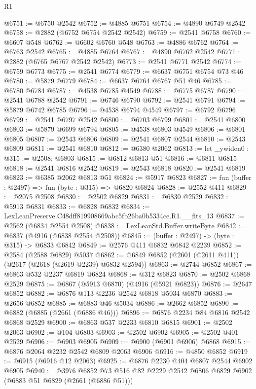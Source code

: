 \begin{lexlean}{R1}
\begin{coremodule}
@6751 := @6750 @2542
@6752 := @4885 @6751
@6754 := @4890 @6749 @2542
@6758 := @2882 (@6752 @6754 @2542 @2542)
@6759 := @2541 @6758
@6760 := @6607 @548
@6762 := @6602 @6760 @548
@6763 := @4886 @6762
@6764 := @6763 @2542
@6765 := @4885 @6764
@6767 := @4890 @6762 @2542
@6771 := @2882 (@6765 @6767 @2542 @2542)
@6773 := @2541 @6771 @2542
@6774 := @6759 @6773
@6775 := @2541 @6774
@6779 := @6637 @6751 @6754 @73 @46
@6780 := @5879 @6779
@6784 := @6637 @6764 @6767 @51 @46
@6785 := @6780 @6784
@6787 := @4538 @6785 @4549
@6788 := @6775 @6787
@6790 := @2541 @6788 @2542
@6791 := @6746 @6790
@6792 := @2541 @6791
@6794 := @5879 @6742 @6785
@6796 := @4538 @6794 @4549
@6797 := @6792 @6796
@6799 := @2541 @6797 @2542
@6800 := @6703 @6799
@6801 := @2541 @6800
@6803 := @5879 @6699 @6794
@6805 := @4538 @6803 @4549
@6806 := @6801 @6805
@6807 := @2543 @6806
@6809 := @2541 @6807 @2544
@6810 := @2543 @6809
@6811 := @2541 @6810
@6812 := @6380 @2062
@6813 := let _ywiden0 : @315 := @2508; @6803
@6815 := @6812 @6813 @51
@6816 := @6811 @6815
@6818 := @2541 @6816 @2542
@6819 := @2543 @6818
@6820 := @2541 @6819
@6823 := @6385 @2062 @6813 @51
@6824 := @5917 @6823
@6827 := fun (buffer : @2497) => fun (byte : @315) => @6820 @6824
@6828 := @2552 @411
@6829 := @2075 @2508
@6830 := @2502 @6829
@6831 := @6830 @2529
@6832 := @5913 @6831
@6833 := @6828 @6832
@6834 := LexLeanPreserve.C48dff819908669abc5fb26ba0b5334ce.R1.__fits_13
@6837 := @2562 (@6834 @2554 @2508)
@6838 := LexLeanStd.Buffer.writeByte
@6842 := @6837 (@4916 (@6838 @2554 @2508))
@6845 := (buffer : @2497) -> (byte : @315) -> @6833 @6842
@6849 := @2576 @411 @6832 @6842 @2239
@6852 := @2584 (@2588 @6829) @5037
@6862 := @6849 @6852 (@2601 (@2611 @411)) (@2617 (@2618 (@2619 @2239) @6832 @2594))
@6863 := @2744 @6852
@6867 := @6863 @532 @2237 @6819 @6824
@6868 := @312 @6823
@6870 := @2502 @6868 @2529
@6875 := @6867 (@5913 @6870) (@4916 (@5921 @6823))
@6876 := @2647 @6852
@6882 := @6876 @113 @2236 @2542 @6818 @5034 @6870
@6883 := @2656 @6852
@6885 := @6883 @46 @5034
@6886 := @2662 @6852
@6890 := @6882 (@6885 (@2661 (@6886 @46)))
@6896 := @6876 @2234 @84 @6816 @2542 @6868 @2529
@6900 := @6863 @537 @2233 @6810 @6815
@6901 := @2502 @2063
@6902 := @104 @6803
@6903 := @2502 @6902
@6905 := @2502 @401 @2529
@6906 := @6903 @6905
@6909 := @6900 (@6901 @6906) @6868
@6915 := @6876 @2064 @2232 @2542 @6809 @2063 @6906
@6916 := @4850 @6852
@6919 := @6915 (@6916 @12 @2063)
@6925 := @6876 @2230 @404 @6807 @2544 @6902 @6905
@6940 := @3976
    @6852
    @73
    @516
    @82
    @2229
    @2542
    @6806
    @6829
    @6902
    (@6883 @51 @6829 (@2661 (@6886 @51)))

\end{coremodule}
\end{lexlean}
